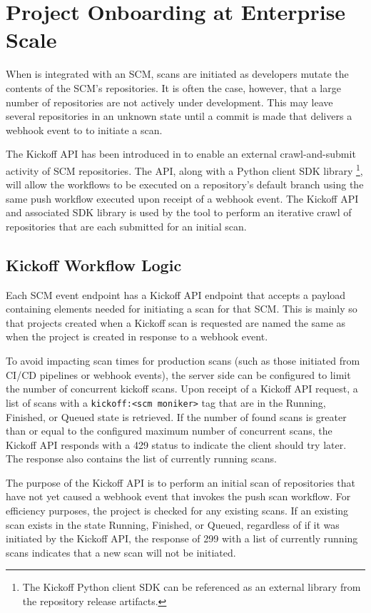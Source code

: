\chapter{Project Onboarding at Enterprise Scale}\label{sec:kickoff}

When \cxoneflow is integrated with an SCM, scans are initiated as developers mutate
the contents of the SCM's repositories.  It is often the case, however, that a large
number of repositories are not actively under development.  This may leave several
repositories in an unknown state until a commit is made that delivers a webhook
event to \cxoneflow to initiate a scan.

The Kickoff API has been introduced in \cxoneflow to enable an external crawl-and-submit
activity of SCM repositories.  The API, along with a Python client SDK library
\footnote{The Kickoff Python client  SDK can be referenced as an external library from the \cxoneflow repository release artifacts.}, will allow
the \cxoneflow workflows to be executed on a repository's default branch using the same
push workflow executed upon receipt of a webhook event.  The Kickoff API and associated SDK library
is used by the \cxoneflowaudit tool to perform an iterative crawl of repositories that are each submitted for an initial scan.


\section{Kickoff Workflow Logic}

Each SCM event endpoint has a Kickoff API endpoint that accepts a payload containing
elements needed for initiating a scan for that SCM.  This is mainly so that projects
created when a Kickoff scan is requested are named the same as when the project
is created in response to a webhook event.

To avoid impacting scan times for production scans (such as those initiated from CI/CD
pipelines or webhook events), the server side can be configured to limit the number of
concurrent kickoff scans.  Upon receipt of a Kickoff API request, a list of scans
with a \texttt{kickoff:<scm moniker>} tag that are in the Running, Finished, or Queued
state is retrieved.  If the number of found scans is greater than or equal to the configured
maximum number of concurrent scans, the Kickoff API responds with a 429 status to indicate
the client should try later.  The response also contains the list of currently running scans.

The purpose of the Kickoff API is to perform an initial scan of repositories that have not
yet caused a webhook event that invokes the \cxoneflow push scan workflow.  For efficiency
purposes, the project is checked for any existing scans.  If an existing scan exists in the
state Running, Finished, or Queued, regardless of if it was initiated by the Kickoff API,
the response of 299 with a list of currently running scans indicates that a new scan will
not be initiated.


